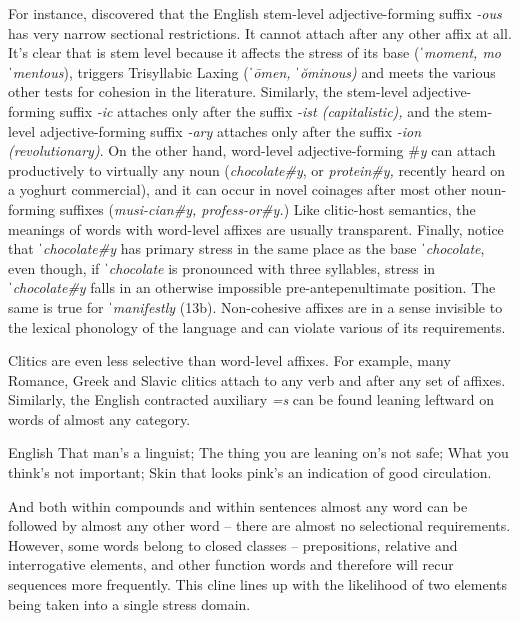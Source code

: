 \documentclass[output=paper,
modfonts
]{LSP/langsci}
\begin{document}
\noindent For instance, \citet{fabb1988} discovered that the English stem-level adjective-forming suffix \textit{{}-ous} has very narrow sectional restrictions. It cannot attach after any other affix at all. It’s clear that  is stem level because it affects the stress of its base (\textit{ˈ}\textit{moment, mo}\textit{ˈ}\textit{mentous}), triggers Trisyllabic Laxing (\textit{ˈ}\textit{\=o}\textit{men,} \textit{ˈ}\textit{\u{o}}\textit{minous)} and meets the various other tests for cohesion in the literature. Similarly, the stem-level adjective-forming suffix \textit{{}-ic} attaches only after the suffix \textit{{}-ist (capitalistic),} and the stem-level adjective-forming suffix \textit{{}-ary} attaches only after the suffix\textit{ -ion (revolutionary)}. On the other hand, word-level adjective-forming \#\textit{y} can attach productively to virtually any noun (\textit{chocolate\#y}, or \textit{protein\#y,} recently heard on a yoghurt commercial), and it can occur in novel coinages after most other noun-forming suffixes (\textit{musi-cian\#y, profess-or\#y.}) Like clitic-host semantics, the meanings of words with word-level affixes are usually transparent. Finally, notice that ˈ\textit{chocolate\#y} has primary stress in the same place as the base ˈ\textit{chocolate}, even though, if ˈ\textit{chocolate} is pronounced with three syllables, stress in ˈ\textit{chocolate\#y} falls in an otherwise impossible pre-antepenultimate position. The same is true for ˈ\textit{manifestly} (13b). Non-cohesive affixes are in a sense invisible to the lexical phonology of the language and can violate various of its requirements. 

Clitics are even less selective than word-level affixes. For example, many Romance, Greek and Slavic clitics attach to any verb and after any set of affixes. Similarly, the English contracted auxiliary \textit{=s} can be found leaning leftward on words of almost any category. 

\ea English
	\ea That man’s a linguist; 
	\ex The thing you are leaning on’s not safe; 
	\ex What you think’s not important;
	\ex Skin that looks pink’s an indication of good circulation.
	\z
\z

\noindent And both within compounds and within sentences almost any word can be followed by almost any other word -- there are almost no selectional requirements. However, some words belong to closed classes -- prepositions, relative and interrogative elements, and other function words and therefore will recur sequences more frequently. This cline lines up with the likelihood of two elements being taken into a single stress domain.
\end{document}
